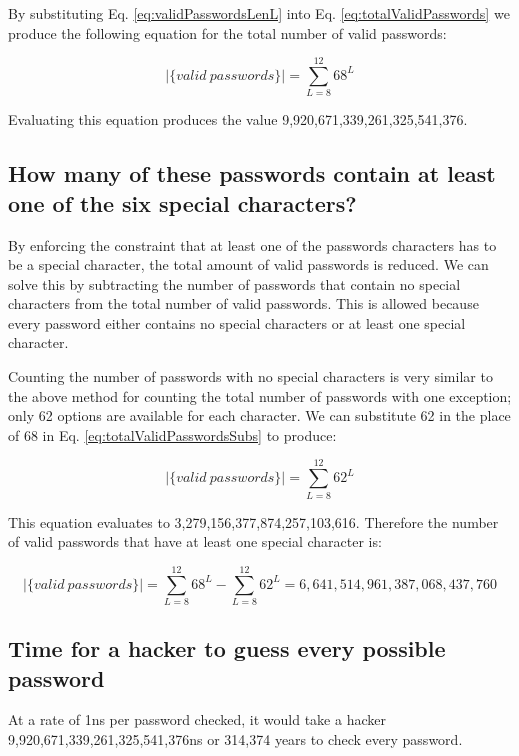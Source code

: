 By substituting Eq. \ref{eq:validPasswordsLenL} into Eq. \ref{eq:totalValidPasswords} we produce the following equation for the total number of valid passwords:

\begin{equation}
|\{valid~passwords\}| = \sum_{L=8}^{12}{68^L}
\label{eq:totalValidPasswordsSubs}
\end{equation}

Evaluating this equation produces the value 9,920,671,339,261,325,541,376.

\subsection{How many of these passwords contain at least one of the six special characters?}
By enforcing the constraint that at least one of the passwords characters has to be a special character, the total amount of valid passwords is reduced. We can solve this by subtracting the number of passwords that contain no special characters from the total number of valid passwords. This is allowed because every password either contains no special characters or at least one special character.

Counting the number of passwords with no special characters is very similar to the above method for counting the total number of passwords with one exception; only 62 options are available for each character. We can substitute 62 in the place of 68 in Eq. \ref{eq:totalValidPasswordsSubs} to produce:

\begin{equation}
|\{valid~passwords\}| = \sum_{L=8}^{12}{62^L}
\label{eq:totalValidPasswordsNoSpecial}
\end{equation}

This equation evaluates to 3,279,156,377,874,257,103,616. Therefore the number of valid passwords that have at least one special character is:

\begin{equation}
|\{valid~passwords\}| = \sum_{L=8}^{12}{68^L} - \sum_{L=8}^{12}{62^L} = 6,641,514,961,387,068,437,760
\label{eq:totalValidPasswordsSomeSpecial}
\end{equation}

\subsection{Time for a hacker to guess every possible password}
At a rate of 1ns per password checked, it would take a hacker 9,920,671,339,261,325,541,376ns or 314,374 years to check every password. 